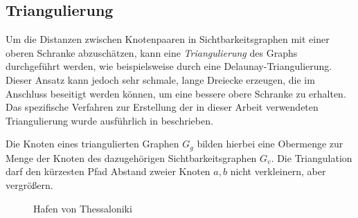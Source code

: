 \subsection{Triangulierung}

Um die Distanzen zwischen Knotenpaaren in Sichtbarkeitsgraphen mit einer oberen Schranke abzuschätzen, kann eine \emph{Triangulierung} des Graphs durchgeführt werden, wie beispielsweise durch eine Delaunay-Triangulierung.
Dieser Ansatz kann jedoch sehr schmale, lange Dreiecke erzeugen, die im Anschluss beseitigt werden können, um eine bessere obere Schranke zu erhalten.
Das spezifische Verfahren zur Erstellung der in dieser Arbeit verwendeten Triangulierung wurde ausführlich in \cite{funkescalable} beschrieben.

Die Knoten eines triangulierten Graphen $G_g$ bilden hierbei eine Obermenge zur Menge der Knoten des dazugehörigen Sichtbarkeitsgraphen $G_v$.
Die Triangulation darf den kürzesten Pfad Abstand zweier Knoten $a, b$ nicht verkleinern, aber vergrößern.

\begin{figure}[h!]%
  \centering
  \caption{Hafen von Thessaloniki}%
  \label{fig:thessaloniki_comparison}%
\end{figure}

